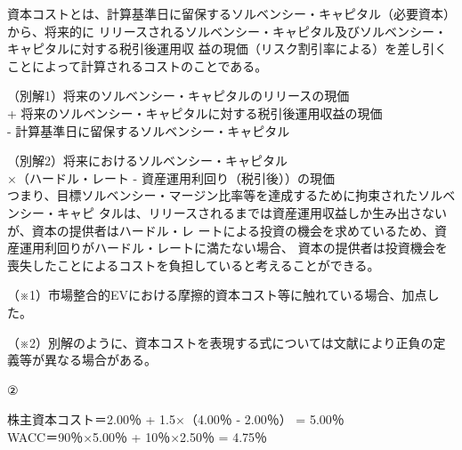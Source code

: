 \documentclass[report,gutter=10mm,fore-edge=10mm,uplatex,dvipdfmx]{jlreq}
\begin{document}
資本コストとは、計算基準日に留保するソルベンシー・キャピタル（必要資本）から、将来的に
リリースされるソルベンシー・キャピタル及びソルベンシー・キャピタルに対する税引後運用収
益の現価（リスク割引率による）を差し引くことによって計算されるコストのことである。

（別解1）将来のソルベンシー・キャピタルのリリースの現価\\
+ 将来のソルベンシー・キャピタルに対する税引後運用収益の現価\\
- 計算基準日に留保するソルベンシー・キャピタル

（別解2）将来におけるソルベンシー・キャピタル\\
×（ハードル・レート - 資産運用利回り（税引後））の現価\\

つまり、目標ソルベンシー・マージン比率等を達成するために拘束されたソルベンシー・キャピ
タルは、リリースされるまでは資産運用収益しか生み出さないが、資本の提供者はハードル・レ
ートによる投資の機会を求めているため、資産運用利回りがハードル・レートに満たない場合、
資本の提供者は投資機会を喪失したことによるコストを負担していると考えることができる。

（※1）市場整合的EVにおける摩擦的資本コスト等に触れている場合、加点した。

（※2）別解のように、資本コストを表現する式については文献により正負の定義等が異なる場合がある。

②

株主資本コスト＝2.00％ + 1.5×（4.00％ - 2.00％） = 5.00％\\
WACC＝90％×5.00％ + 10％×2.50％ = 4.75％
\end{document}
